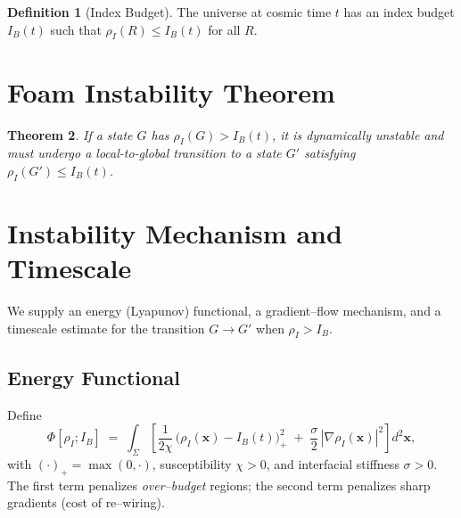 \documentclass[11pt]{article}
\theoremstyle{plain}
\newtheorem{theorem}{Theorem}[section]
\theoremstyle{definition}
\newtheorem{definition}[theorem]{Definition}
\begin{document}
\begin{definition}[Index Budget]
  The universe at cosmic time $t$ has an index budget $I_B(t)$ such that $\rho_I(R) \le I_B(t)$ for all $R$.
\end{definition}

\section{Foam Instability Theorem}
\begin{theorem}
  If a state $G$ has $\rho_I(G) > I_B(t)$, it is dynamically unstable and must undergo a local-to-global transition to a state $G'$ satisfying $\rho_I(G') \le I_B(t)$.
\end{theorem}

\section{Instability Mechanism and Timescale}\label{sec:instability-proof}

We supply an energy (Lyapunov) functional, a gradient–flow mechanism, and a timescale estimate for the transition $G\to G'$ when $\rho_I>I_B$.

\subsection{Energy Functional}\label{subsec:energy-functional}
Define
\begin{equation}
  \Phi[\rho_I; I_B]
  \;=\;
  \int_{\Sigma}\!\left[
    \frac{1}{2\chi}\,\big(\rho_I(\mathbf{x})-I_B(t)\big)_+^2 \;+\; \frac{\sigma}{2}\,|\nabla \rho_I(\mathbf{x})|^2
  \right] d^2\mathbf{x},
  \label{eq:phi-functional}
\end{equation}
with $(\cdot)_+=\max(0,\cdot)$, susceptibility $\chi>0$, and interfacial stiffness $\sigma>0$. The first term penalizes \emph{over–budget} regions; the second term penalizes sharp gradients (cost of re–wiring).
\end{document}

